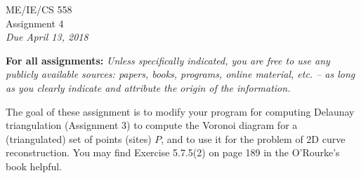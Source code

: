 \documentclass[11pt]{article}
\begin{document}
\begin{center}
{\Large ME/IE/CS 558}\\
\vspace{12pt}
{\large Assignment 4}\\
\vspace{12pt}
{\em Due April 13, 2018}
\end{center}

{\bf For all assignments:}
{\em Unless specifically indicated,  you are free to use any
publicly available sources: papers, books, programs, online
material, etc. -- as long as you clearly indicate and attribute
the origin of the information.}


\vspace{24pt}
The goal of these assignment is to modify your program for 
computing Delaunay triangulation
(Assignment 3) to compute the Voronoi diagram for a (triangulated)
set of points (sites) $P$,  and to use it for the problem of 2D
curve reconstruction.   You may find 
Exercise 5.7.5(2) on page 189 in the O'Rourke's book helpful.
\end{document}
